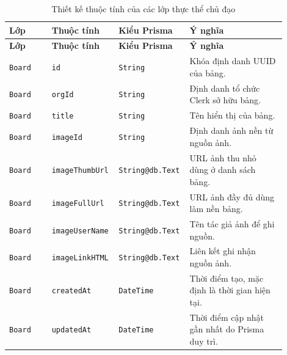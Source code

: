 \documentclass[../DoAn.tex]{subfiles}
\begin{document}
\begingroup
\small
\setlength{\tabcolsep}{3pt}
\renewcommand{\arraystretch}{1.15}
\begin{longtable}{|>{\raggedright\arraybackslash}p{0.15\linewidth}|>{\raggedright\arraybackslash}p{0.22\linewidth}|>{\raggedright\arraybackslash}p{0.19\linewidth}|>{\raggedright\arraybackslash}p{0.34\linewidth}|}
    \caption{Thiết kế thuộc tính của các lớp thực thể chủ đạo}
    \label{table:chapter4_core_entities}\\
    \hline
    \textbf{Lớp} & \textbf{Thuộc tính} & \textbf{Kiểu Prisma} & \textbf{Ý nghĩa} \\ \hline
    \endfirsthead
    \hline
    \textbf{Lớp} & \textbf{Thuộc tính} & \textbf{Kiểu Prisma} & \textbf{Ý nghĩa} \\ \hline
    \endhead
    \texttt{Board} & \texttt{id} & \texttt{String} & Khóa định danh UUID của bảng. \\ \hline
    \texttt{Board} & \texttt{orgId} & \texttt{String} & Định danh tổ chức Clerk sở hữu bảng. \\ \hline
    \texttt{Board} & \texttt{title} & \texttt{String} & Tên hiển thị của bảng. \\ \hline
    \texttt{Board} & \texttt{imageId} & \texttt{String} & Định danh ảnh nền từ nguồn ảnh. \\ \hline
    \texttt{Board} & \texttt{imageThumb}\newline\texttt{Url} & \texttt{String}\newline\texttt{@db.Text} & URL ảnh thu nhỏ dùng ở danh sách bảng. \\ \hline
    \texttt{Board} & \texttt{imageFullUrl} & \texttt{String}\newline\texttt{@db.Text} & URL ảnh đầy đủ dùng làm nền bảng. \\ \hline
    \texttt{Board} & \texttt{imageUser}\newline\texttt{Name} & \texttt{String}\newline\texttt{@db.Text} & Tên tác giả ảnh để ghi nguồn. \\ \hline
    \texttt{Board} & \texttt{imageLink}\newline\texttt{HTML} & \texttt{String}\newline\texttt{@db.Text} & Liên kết ghi nhận nguồn ảnh. \\ \hline
    \texttt{Board} & \texttt{createdAt} & \texttt{DateTime} & Thời điểm tạo, mặc định là thời gian hiện tại. \\ \hline
    \texttt{Board} & \texttt{updatedAt} & \texttt{DateTime} & Thời điểm cập nhật gần nhất do Prisma duy trì. \\ \hline

\end{longtable}
\end{document}
